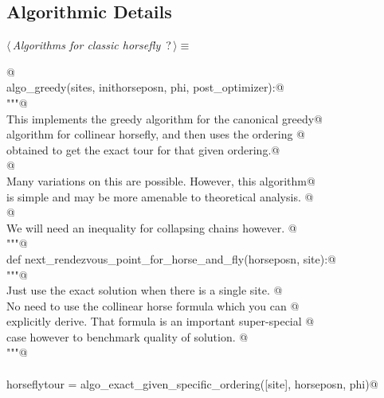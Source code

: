 \documentclass[11.5pt]{report}
\begin{document}
\subsection{Algorithmic Details}
\begin{flushleft} \small\label{scrap20}\raggedright\small
{} $\langle\,${\itshape Algorithms for classic horsefly}\nobreak\ {\footnotesize {?}}$\,\rangle\equiv$
\vspace{-1ex}
\begin{list}{}{} \item
\mbox{}\verb@   @\\
\mbox{}\verb@def algo_greedy(sites, inithorseposn, phi, post_optimizer):@\\
\mbox{}\verb@      """@\\
\mbox{}\verb@      This implements the greedy algorithm for the canonical greedy@\\
\mbox{}\verb@      algorithm for collinear horsefly, and then uses the ordering @\\
\mbox{}\verb@      obtained to get the exact tour for that given ordering.@\\
\mbox{}\verb@      @\\
\mbox{}\verb@      Many variations on this are possible. However, this algorithm@\\
\mbox{}\verb@      is simple and may be more amenable to theoretical analysis. @\\
\mbox{}\verb@      @\\
\mbox{}\verb@      We will need an inequality for collapsing chains however. @\\
\mbox{}\verb@      """@\\
\mbox{}\verb@      def next_rendezvous_point_for_horse_and_fly(horseposn, site):@\\
\mbox{}\verb@            """@\\
\mbox{}\verb@            Just use the exact solution when there is a single site. @\\
\mbox{}\verb@            No need to use the collinear horse formula which you can @\\
\mbox{}\verb@            explicitly derive. That formula is  an important super-special @\\
\mbox{}\verb@            case however to benchmark quality of solution. @\\
\mbox{}\verb@            """@\\
\mbox{}\verb@@\\
\mbox{}\verb@            horseflytour = algo_exact_given_specific_ordering([site], horseposn, phi)@\\

\end{list}
\end{flushleft}
\end{document}
